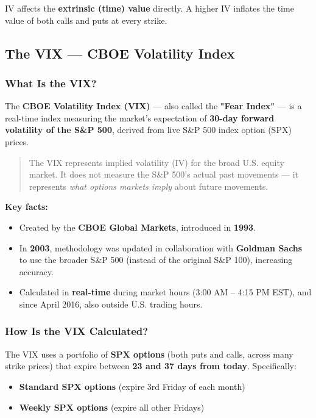 \documentclass[12pt,openany]{book}
\begin{document}
IV affects the \textbf{extrinsic (time) value} directly. A higher IV inflates the time value of both calls and puts at every strike.

\subsection{The VIX — CBOE Volatility Index}

\subsubsection{What Is the VIX?}

The \textbf{CBOE Volatility Index (VIX)} — also called the \textbf{"Fear Index"} — is a real-time index measuring the market's expectation of \textbf{30-day forward volatility of the S\&P 500}, derived from live S\&P 500 index option (SPX) prices.

\begin{quote}
The VIX represents implied volatility (IV) for the broad U.S. equity market. It does not measure the S\&P 500's actual past movements — it represents \emph{what options markets imply} about future movements.
\end{quote}

\textbf{Key facts:}
\begin{itemize}[leftmargin=*]
    \item Created by the \textbf{CBOE Global Markets}, introduced in \textbf{1993}.
    \item In \textbf{2003}, methodology was updated in collaboration with \textbf{Goldman Sachs} to use the broader S\&P 500 (instead of the original S\&P 100), increasing accuracy.
    \item Calculated in \textbf{real-time} during market hours (3:00 AM – 4:15 PM EST), and since April 2016, also outside U.S. trading hours.
\end{itemize}

\subsubsection{How Is the VIX Calculated?}

The VIX uses a portfolio of \textbf{SPX options} (both puts and calls, across many strike prices) that expire between \textbf{23 and 37 days from today}. Specifically:
\begin{itemize}[leftmargin=*]
    \item \textbf{Standard SPX options} (expire 3rd Friday of each month)
    \item \textbf{Weekly SPX options} (expire all other Fridays)
\end{itemize}
\end{document}
